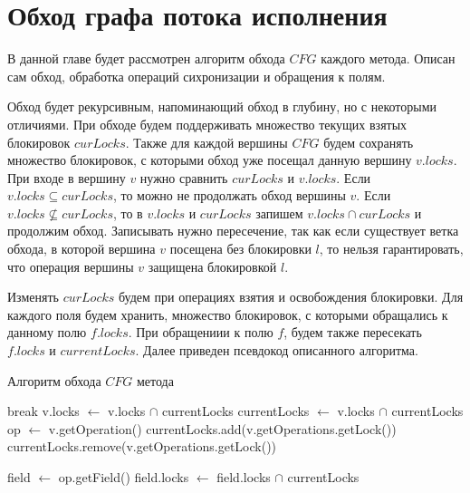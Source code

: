 \section{Обход графа потока исполнения}
В данной главе будет рассмотрен алгоритм обхода $CFG$ каждого метода. Описан сам обход, обработка операций сихронизации и обращения к полям. 

Обход будет рекурсивным, напоминающий обход в глубину, но с некоторыми отличиями. При обходе будем поддерживать множество текущих взятых блокировок $curLocks$. Также для каждой вершины $CFG$ будем сохранять множество блокировок, с которыми обход уже посещал данную вершину $v.locks$.
При входе в вершину $v$ нужно сравнить $curLocks$ и $v.locks$. Если $v.locks \subseteq curLocks$, то можно не продолжать обход вершины $v$. Если $v.locks \nsubseteq curLocks$, то в $v.locks$ и $curLocks$ запишем  $v.locks \cap curLocks$ и продолжим обход. Записывать нужно пересечение, так как если существует ветка обхода, в которой вершина $v$ посещена без блокировки $l$, то нельзя гарантировать, что операция вершины $v$ защищена блокировкой $l$. 

Изменять $curLocks$ будем при операциях взятия и освобождения блокировки. Для каждого поля будем хранить, множество блокировок, с которыми обращались к данному полю $f.locks$. При обращениии к полю $f$, будем также пересекать $f.locks$ и 
$currentLocks$.
Далее приведен псевдокод описанного алгоритма.

\begin{algorithm}
\caption{Алгоритм обхода $CFG$ метода}\label{alg:TraverseCFG}
\begin{algorithmic}
	\State break
\Else
	\State v.locks $\gets$ v.locks $\cap$ currentLocks 
	\State currentLocks $\gets$ v.locks $\cap$ currentLocks 
\EndIf
\State op $\gets$ v.getOperation()
	\State currentLocks.add(v.getOperations.getLock())
\EndIf
{}
	\State currentLocks.remove(v.getOperations.getLock())
\EndIf

	\State field $\gets$ op.getField()
	\State field.locks $\gets$ field.locks $\cap$ currentLocks
\EndIf

	\State {}
\EndFor

\EndFunction
 
\end{algorithmic}
\end{algorithm}

